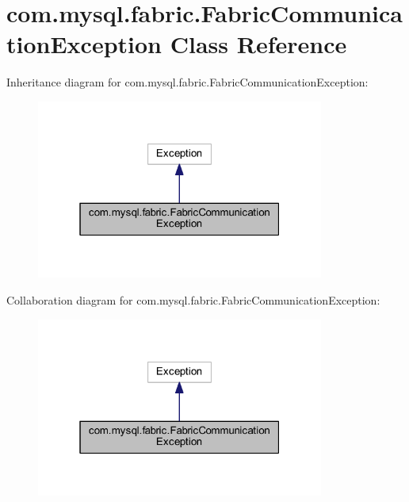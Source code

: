 \hypertarget{classcom_1_1mysql_1_1fabric_1_1_fabric_communication_exception}{}\section{com.\+mysql.\+fabric.\+Fabric\+Communication\+Exception Class Reference}
\label{classcom_1_1mysql_1_1fabric_1_1_fabric_communication_exception}


Inheritance diagram for com.\+mysql.\+fabric.\+Fabric\+Communication\+Exception\+:\nopagebreak
\begin{figure}[H]
\begin{center}
\leavevmode
\includegraphics[width=268pt]{classcom_1_1mysql_1_1fabric_1_1_fabric_communication_exception__inherit__graph}
\end{center}
\end{figure}


Collaboration diagram for com.\+mysql.\+fabric.\+Fabric\+Communication\+Exception\+:\nopagebreak
\begin{figure}[H]
\begin{center}
\leavevmode
\includegraphics[width=268pt]{classcom_1_1mysql_1_1fabric_1_1_fabric_communication_exception__coll__graph}
\end{center}
\end{figure}
